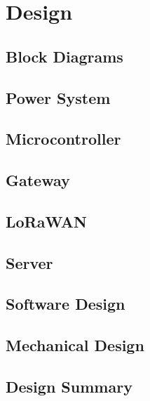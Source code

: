 \section{Design}
\subsection{Block Diagrams}





{}


    \subsection{Power System}
    \subsection{Microcontroller}
    \subsection{Gateway}
    \subsection{LoRaWAN}
    \subsection{Server}
    \subsection{Software Design}
    \subsection{Mechanical Design}
    \subsection{Design Summary}

